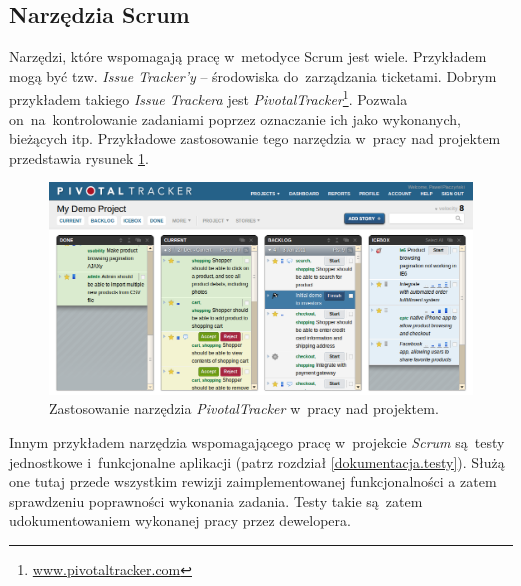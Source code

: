 \subsection{Narzędzia Scrum} \label{scrum.narzedzia}

Narzędzi, które wspomagają pracę w~metodyce Scrum jest wiele. Przykładem mogą być tzw. \textit{Issue Tracker'y} -- środowiska do~zarządzania ticketami. Dobrym przykładem takiego \textit{Issue Trackera} jest \textit{PivotalTracker}\footnote{\url{www.pivotaltracker.com}}. Pozwala on~na~kontrolowanie zadaniami poprzez oznaczanie ich jako wykonanych, bieżących itp. Przykładowe zastosowanie tego narzędzia w~pracy nad projektem przedstawia rysunek \ref{fig.rysunek.pivotal}.

\begin{figure}[!t]
\centering
\includegraphics[width=\textwidth]{obrazki/pivotal.png}
\caption[Narzędzie \textit{PivotalTracker}]{Zastosowanie narzędzia \textit{PivotalTracker} w~pracy nad projektem. \cite{pivotaltracker}}
\label{fig.rysunek.pivotal}
\end{figure}

Innym przykładem narzędzia wspomagającego pracę w~projekcie \textit{Scrum} są~testy jednostkowe i~funkcjonalne aplikacji (patrz rozdział \ref{dokumentacja.testy}). Służą one tutaj przede wszystkim rewizji zaimplementowanej funkcjonalności a zatem sprawdzeniu poprawności wykonania zadania. Testy takie są~zatem udokumentowaniem wykonanej pracy przez dewelopera.
